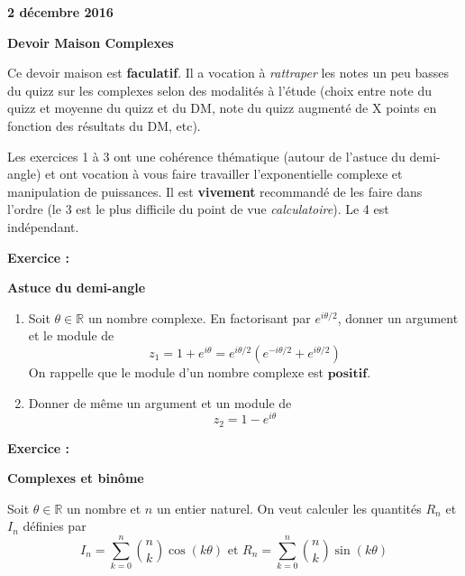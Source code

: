 \documentclass[a4paper,12pt]{article}\usepackage[]{graphicx}\usepackage[]{color}
\def\Exam{Devoir Maison \og Complexes \fg{}}
\def\Date{2 décembre 2016}
\begin{document}
\setcounter{nexo}{1}
\newcommand{\Exo}{\medskip
  {\bf Exercice \arabic{nexo} : }
  \addtocounter{nexo}{1}}
\newcommand{\Pb}{{\bf Problème \arabic{nexo} : } 
\addtocounter{nexo}{1} \bigskip}
{\bf  \hfill \Date \quad ~}
%
\vskip 1cm
%
\centerline{\bf \LARGE \Exam}
%
\vskip 1.5cm
%



Ce devoir maison est \textbf{faculatif}. Il a vocation à \emph{rattraper} les notes un peu basses du quizz sur les complexes selon des modalités à l'étude (choix entre note du quizz et moyenne du quizz et du DM, note du quizz augmenté de X points en fonction des résultats du DM, etc). 

Les exercices 1 à 3 ont une cohérence thématique (autour de l'astuce du demi-angle) et ont vocation à vous faire travailler l'exponentielle complexe et manipulation de puissances. Il est \textbf{vivement} recommandé de les faire dans l'ordre (le 3 est le plus difficile du point de vue \emph{calculatoire}). Le 4 est indépendant. 

\Exo \textbf{Astuce du demi-angle}

\begin{enumerate}
\item Soit $\theta \in \mathbb{R}$ un nombre complexe. En factorisant par $e^{i\theta/2}$, donner un argument et le module de 
$$z_1 = 1 + e^{i\theta} = e^{i\theta/2} (e^{-i\theta/2} + e^{i\theta/2})$$
On rappelle que le module d'un nombre complexe est $\textbf{positif}$.
\item Donner de même un argument et un module de 
$$z_2 = 1 - e^{i\theta}$$
\end{enumerate}

\Exo \textbf{Complexes et binôme}

Soit $\theta \in \mathbb{R}$ un nombre et $n$ un entier naturel. On veut calculer les quantités $R_n$ et $I_n$ définies par 
\begin{equation*}
I_n  = \sum_{k=0}^n {n \choose k} \cos(k\theta) \text{ et } R_n  = \sum_{k=0}^n {n \choose k} \sin(k\theta)
\end{equation*}
\end{document}
